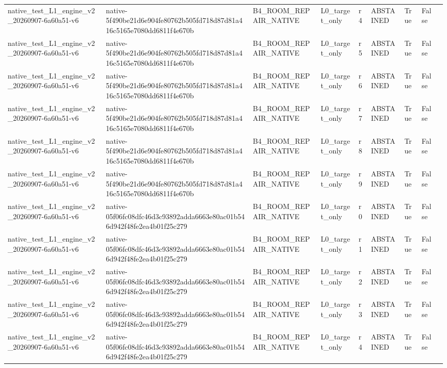 \begin{tabular}{lllllllll}
native\_test\_L1\_engine\_v2\_20260907-6a60a51-v6 & native-5f490be21d6e904fe80762b505fd718d87d81a416c5165e7080dd6811f4e670b & B4\_ROOM\_REPAIR\_NATIVE & L0\_target\_only & r4 & ABSTAINED & True & False &  \\
native\_test\_L1\_engine\_v2\_20260907-6a60a51-v6 & native-5f490be21d6e904fe80762b505fd718d87d81a416c5165e7080dd6811f4e670b & B4\_ROOM\_REPAIR\_NATIVE & L0\_target\_only & r5 & ABSTAINED & True & False &  \\
native\_test\_L1\_engine\_v2\_20260907-6a60a51-v6 & native-5f490be21d6e904fe80762b505fd718d87d81a416c5165e7080dd6811f4e670b & B4\_ROOM\_REPAIR\_NATIVE & L0\_target\_only & r6 & ABSTAINED & True & False &  \\
native\_test\_L1\_engine\_v2\_20260907-6a60a51-v6 & native-5f490be21d6e904fe80762b505fd718d87d81a416c5165e7080dd6811f4e670b & B4\_ROOM\_REPAIR\_NATIVE & L0\_target\_only & r7 & ABSTAINED & True & False &  \\
native\_test\_L1\_engine\_v2\_20260907-6a60a51-v6 & native-5f490be21d6e904fe80762b505fd718d87d81a416c5165e7080dd6811f4e670b & B4\_ROOM\_REPAIR\_NATIVE & L0\_target\_only & r8 & ABSTAINED & True & False &  \\
native\_test\_L1\_engine\_v2\_20260907-6a60a51-v6 & native-5f490be21d6e904fe80762b505fd718d87d81a416c5165e7080dd6811f4e670b & B4\_ROOM\_REPAIR\_NATIVE & L0\_target\_only & r9 & ABSTAINED & True & False &  \\
native\_test\_L1\_engine\_v2\_20260907-6a60a51-v6 & native-05f06fc08dfc46d3c93892adda6663e80ac01b546d942f48fe2ea4b01f25c279 & B4\_ROOM\_REPAIR\_NATIVE & L0\_target\_only & r0 & ABSTAINED & True & False &  \\
native\_test\_L1\_engine\_v2\_20260907-6a60a51-v6 & native-05f06fc08dfc46d3c93892adda6663e80ac01b546d942f48fe2ea4b01f25c279 & B4\_ROOM\_REPAIR\_NATIVE & L0\_target\_only & r1 & ABSTAINED & True & False &  \\
native\_test\_L1\_engine\_v2\_20260907-6a60a51-v6 & native-05f06fc08dfc46d3c93892adda6663e80ac01b546d942f48fe2ea4b01f25c279 & B4\_ROOM\_REPAIR\_NATIVE & L0\_target\_only & r2 & ABSTAINED & True & False &  \\
native\_test\_L1\_engine\_v2\_20260907-6a60a51-v6 & native-05f06fc08dfc46d3c93892adda6663e80ac01b546d942f48fe2ea4b01f25c279 & B4\_ROOM\_REPAIR\_NATIVE & L0\_target\_only & r3 & ABSTAINED & True & False &  \\
native\_test\_L1\_engine\_v2\_20260907-6a60a51-v6 & native-05f06fc08dfc46d3c93892adda6663e80ac01b546d942f48fe2ea4b01f25c279 & B4\_ROOM\_REPAIR\_NATIVE & L0\_target\_only & r4 & ABSTAINED & True & False &  \\

\end{tabular}
